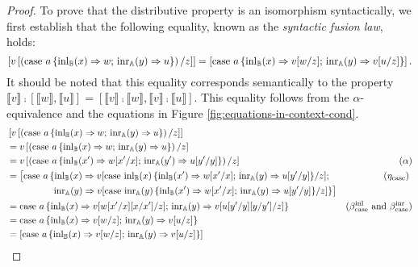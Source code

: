 \documentclass[a4paper,UKenglish,cleveref, autoref, thm-restate]{lipics-v2021}
\begin{document}
\begin{proof}
 
  To prove that the distributive property is an isomorphism syntactically, we first establish that the following equality, known  as the \emph{syntactic fusion law}, holds:
  \begin{equation*}
    \left[v\left[ \left(\text{case } a \,\{\mathrm{inl}_{\mathbb{B}}(x) \Rightarrow w ; \, \mathrm{inr}_{\mathbb{A}}(y) \Rightarrow u\}\right)  / z \right]\right] =   \left[\text{case } a \,\{\mathrm{inl}_{\mathbb{B}}(x) \Rightarrow v[w/z] ; \, \mathrm{inr}_{\mathbb{A}}(y) \Rightarrow v[u/z]\} \right].
  \end{equation*}
It should be noted that this equality corresponds semantically to the property  $ \llbracket v \rrbracket \comp [ \llbracket w \rrbracket,  \llbracket u \rrbracket] = [ \llbracket v \rrbracket \comp \llbracket w \rrbracket,\llbracket v \rrbracket \comp \llbracket u \rrbracket ] $.
This equality follows from the $\alpha$-equivalence and the equations in Figure \ref{fig:equations-in-context-cond}. 
\begin{align*}
  &\left[v\left[ \left(\text{case } a \,\{\inl_{\typeB}(x) \Rightarrow w ; \, \inr_{\typeA}(y) \Rightarrow u\}\right)  / z \right]\right] & \\
  &  = v \left[ \left(\text{case } a \,\{\inl_{\typeB}(x) \Rightarrow w ; \, \inr_{\typeA}(y) \Rightarrow u\}\right)  / z \right] & \\
  & =v  \left[ \left(\text{case } a \,\{\inl_{\typeB}(x') \Rightarrow w[x'/x] ; \, \inr_{\typeA}(y') \Rightarrow u[y'/y]\}\right)  / z \right] & (\alpha) \\
  & = \big[ \text{case } a \,\{\inl_{\typeB}(x) \Rightarrow v[\text{case } \inl_{\typeB}(x) \,\{\inl_{\typeB}(x') \Rightarrow w[x'/x] ; \, \inr_{\typeA}(y) \Rightarrow u[y'/y]\}/z] ; \, & (\eta_{\text{case}}) \ \\
   & \hspace{50pt} \inr_{\typeA}(y) \Rightarrow  v[\text{case } \inr_{\typeA}(y) \,\{\inl_{\typeB}(x') \Rightarrow w[x'/x] ; \, \inr_{\typeA}(y) \Rightarrow u[y'/y]\}/z]\}\big]  \\
   & = \text{case } a \,\{\inl_{\typeB}(x) \Rightarrow v[w[x'/x][x/x']/z] ; \, \inr_{\typeA}(y) \Rightarrow v[u[y'/y][y/y']/z]\}   & (\beta_{\text{case}}^{\text{inl}} \text{ and } \beta_{\text{case}}^{\text{inr}}  ) \\
   & =  \text{case } a \,\{\inl_{\typeB}(x) \Rightarrow v[w/z] ; \, \inr_{\typeA}(y) \Rightarrow v[u/z]\}  \\
   & = \left[ \text{case } a \,\{\inl_{\typeB}(x) \Rightarrow v[w/z] ; \, \inr_{\typeA}(y) \Rightarrow v[u/z]\}\right] 

\end{align*}
\end{proof}
\end{document}
